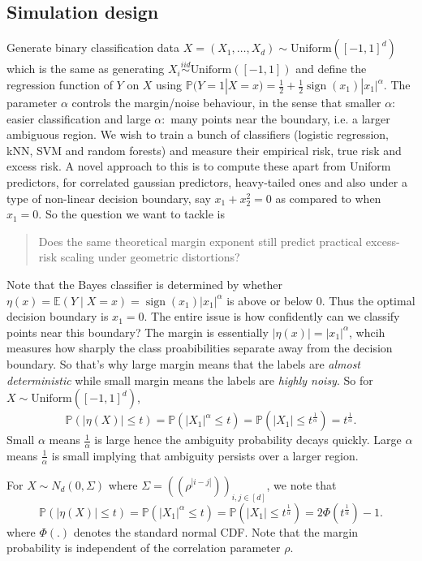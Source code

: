 \subsection{Simulation design}
Generate binary classification data $X=(X_1,\ldots,X_d)\sim \text{Uniform}([-1,1]^d)$ which is the same as generating $X_i \overset{iid}{\sim}\text{Uniform}([-1,1])$ and define the regression function of $Y$ on $X$ using $\mathbb{P}(Y=1|X=x)=\frac{1}{2}+\frac{1}{2}\operatorname{sign}(x_1)|x_1|^\alpha$.
The parameter $\alpha$ controls the margin/noise behaviour, in the sense that smaller $\alpha:$ easier classification and large $\alpha:$ many points near the boundary, i.e. a larger ambiguous region. We wish to train a bunch of classifiers (logistic regression, kNN, SVM and random forests) and measure their empirical risk, true risk and excess risk. A novel approach to this is to compute these apart from Uniform predictors, for correlated gaussian predictors, heavy-tailed ones and also under a type of non-linear decision boundary, say $x_1+x_2^2=0$ as compared to when $x_1=0$.
So the question we want to tackle is
\begin{quote}
  Does the same theoretical margin exponent still predict practical excess-risk scaling under geometric distortions?
\end{quote}
Note that the Bayes classifier is determined by whether $\eta(x)=\mathbb{E}(Y\mid X=x)=\operatorname{sign}(x_1)|x_1|^\alpha$ is above or below 0. Thus the optimal decision boundary is $x_1=0$. The entire issue is how confidently can we classify points near this boundary? The margin is essentially $|\eta(x)| = |x_1|^\alpha$, whcih measures how sharply the class proabibilities separate away from the decision boundary. So that's why large margin means that the labels are \textit{almost deterministic} while small margin means the labels are \textit{highly noisy}. So for $X\sim \text{Uniform}([-1,1]^d)$,
$$
  \mathbb{P}(|\eta(X)|\le t)=\mathbb{P}(|X_1|^\alpha \le t)=\mathbb{P}(|X_1|\le t^
  \frac{1}{\alpha})=t^\frac{1}{\alpha}.
$$
Small $\alpha$ means $\frac{1}{\alpha}$ is large hence the ambiguity probability decays quickly. Large $\alpha$ means $\frac{1}{\alpha}$ is small implying that ambiguity persists over a larger region.

For $X\sim N_d(0,\Sigma)$ where $\Sigma=((\rho^{|i-j|}))_{i,j\in [d]}$, we note that
$$
  \mathbb{P}(|\eta(X)|\le t)=\mathbb{P}(|X_1|^\alpha \le t)=\mathbb{P}(|X_1|\le t^
  \frac{1}{\alpha})=2\Phi(t^\frac{1}{\alpha})-1.
$$
where $\Phi(.)$ denotes the standard normal CDF. Note that the margin probability is independent of the correlation parameter $\rho$.

